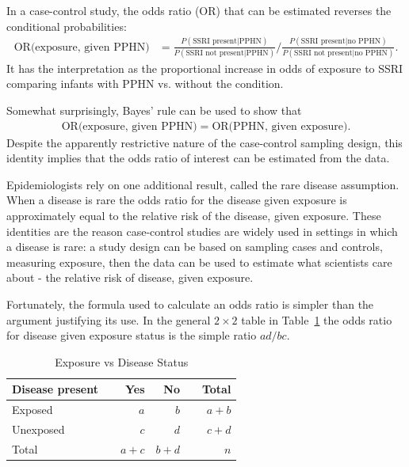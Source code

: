 In a case-control study, the odds ratio (OR) that can be estimated reverses  the conditional probabilities:
\begin{align*}
  \text{OR(exposure, given PPHN)} &=\frac{P(\text{SSRI present} | \text{PPHN})}
  {P(\text{SSRI not present} | \text{PPHN})} \bigg/
 \frac{P(\text{SSRI present} | \text{no PPHN})}
  {P(\text{SSRI not present} | \text{no PPHN})}.
\end{align*}
It has the interpretation as the proportional increase in odds of exposure to SSRI comparing infants with PPHN vs. without the condition.

Somewhat surprisingly, Bayes' rule can be used to show that 
\begin{align*}
  \text{OR(exposure, given PPHN)} =  \text{OR(PPHN, given exposure)}.  
\end{align*}
Despite the apparently restrictive nature of the case-control sampling design, this identity implies that the odds ratio of interest can be estimated from the data.

Epidemiologists rely on one additional result, called the rare disease assumption. When a disease is rare the odds ratio for the disease given exposure is approximately equal to the relative risk of the disease, given exposure.  These identities are the reason case-control studies are widely used in settings in which a disease is rare: a study design can be based on sampling cases and controls, measuring exposure, then the data can be used to estimate what scientists care about - the relative risk of disease, given exposure.

Fortunately, the formula used to calculate an odds ratio is simpler than the argument justifying its use. In the general $2 \times 2$ table in Table~\ref{generalTwoByTwoTable} the odds ratio for disease given exposure status is the simple ratio $ad/bc$.
 \begin{table}[h]
	\centering
	\begin{tabular}{ll rrr r}
		\hline
		Disease present  & \hspace{2mm} & Yes & No & \hspace{2mm} & Total \\
		\hline
		Exposed &	& $a$ & $b$ &  & $a + b$  \\
		Unexposed & & $c$ & $d$ &  & $c + d $  \\
        Total & & $a + c$ & $b + d$ & & $n$ \\
		\hline
	\end{tabular}
    \caption{Exposure vs Disease Status}
    \label{generalTwoByTwoTable}
\end{table}	

